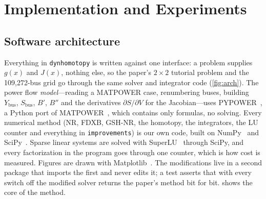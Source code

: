 \documentclass[sigconf,nonacm]{acmart}
\newcommand{\code}[1]{\texttt{#1}}
\begin{document}
\section{Implementation and Experiments}\label{sec:impl}

\subsection{Software architecture}
Everything in \code{dynhomotopy} is written against one interface: a problem supplies $g(x)$ and $J(x)$,
nothing else, so the paper's $2\times2$ tutorial problem and the 109{,}272-bus grid go through the same
solver and integrator code (\cref{fig:arch}). The power flow \emph{model}---reading a MATPOWER case,
renumbering buses, building $Y_{\mathrm{bus}}$, $S_{\mathrm{bus}}$, $B'$, $B''$ and the derivatives
$\partial S/\partial V$ for the Jacobian---uses PYPOWER~\cite{pypower}, a Python port of
MATPOWER~\cite{matpower}, which contains only formulas, no solving. Every numerical method (NR, FDXB,
GSH-NR, the homotopy, the integrators, the LU counter and everything in \code{improvements}) is our own code,
built on NumPy~\cite{numpy} and SciPy~\cite{scipy}. Sparse linear systems are solved with SuperLU~\cite{superlu}
through SciPy, and every factorization in the program goes through one counter, which is how cost is
measured. Figures are drawn with Matplotlib~\cite{matplotlib}. The modifications live in a second package
that imports the first and never edits it; a test asserts that with every switch off the modified solver
returns the paper's method bit for bit.  shows the core of the method.
\end{document}
